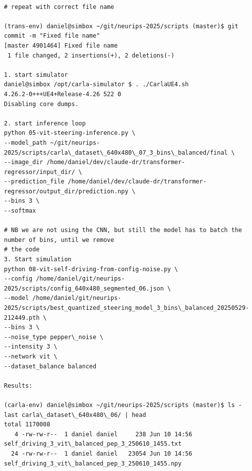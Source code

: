 \begin{verbatim}

# repeat with correct file name

(trans-env) daniel@simbox ~/git/neurips-2025/scripts (master)$ git commit -m "Fixed file name"
[master 4901464] Fixed file name
 1 file changed, 2 insertions(+), 2 deletions(-)
 
1. start simulator
daniel@simbox /opt/carla-simulator $ . ./CarlaUE4.sh 
4.26.2-0+++UE4+Release-4.26 522 0
Disabling core dumps.

2. start inference loop
python 05-vit-steering-inference.py \
--model_path ~/git/neurips-2025/scripts/carla\_dataset\_640x480\_07_3_bins\_balanced/final \
--image_dir /home/daniel/dev/claude-dr/transformer-regressor/input_dir/ \
--prediction_file /home/daniel/dev/claude-dr/transformer-regressor/output_dir/prediction.npy \
--bins 3 \
--softmax

# NB we are not using the CNN, but still the model has to batch the number of bins, until we remove
# the code
3. Start simulation
python 08-vit-self-driving-from-config-noise.py \
--config /home/daniel/git/neurips-2025/scripts/config_640x480_segmented_06.json \
--model /home/daniel/git/neurips-2025/scripts/best_quantized_steering_model_3_bins\_balanced_20250529-212449.pth \
--bins 3 \
--noise_type pepper\_noise \
--intensity 3 \
--network vit \
--dataset_balance balanced

Results:

(carla-env) daniel@simbox ~/git/neurips-2025/scripts (master)$ ls -last carla\_dataset\_640x480\_06/ | head
total 1170008
   4 -rw-rw-r--  1 daniel daniel     238 Jun 10 14:56 self_driving_3_vit\_balanced_pep_3_250610_1455.txt
  24 -rw-rw-r--  1 daniel daniel   23054 Jun 10 14:56 self_driving_3_vit\_balanced_pep_3_250610_1455.npy



\end{verbatim}


